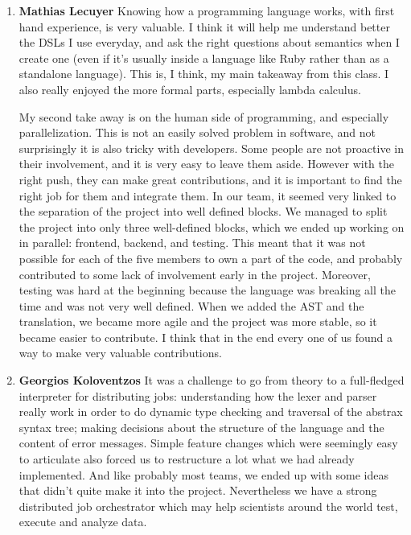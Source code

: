 \begin{enumerate}
\item \textbf{Mathias Lecuyer}
Knowing how a programming language works, with first hand experience, is very valuable.
I think it will help me understand better the DSLs I use everyday, and ask the right questions about semantics when I create one (even if it's usually inside a language like Ruby rather than as a standalone language).
This is, I think, my main takeaway from this class. I also really enjoyed the more formal parts, especially lambda calculus.

My second take away is on the human side of programming, and especially parallelization.
This is not an easily solved problem in software, and not surprisingly it is also tricky with developers.
Some people are not proactive in their involvement, and it is very easy to leave them aside.
However with the right push, they can make great contributions, and it is important to find the right job for them and integrate them.
In our team, it seemed very linked to the separation of the project into well defined blocks.
We managed to split the project into only three well-defined blocks, which we ended up working on in parallel: frontend, backend, and testing.
This meant that it was not possible for each of the five members to own a part of the code, and probably contributed to some lack of involvement early in the project.
Moreover, testing was hard at the beginning because the language was breaking all the time and was not very well defined.
When we added the AST and the translation, we became more agile and the project was more stable, so it became easier to contribute.
I think that in the end every one of us found a way to make very valuable contributions.


\item \textbf{Georgios Koloventzos}
It was a challenge to go from theory to a full-fledged interpreter for distributing jobs: understanding how the lexer and parser really work in order to do dynamic type checking and traversal of the abstrax syntax tree; making decisions about the structure of the language and the content of error messages. Simple feature changes which were seemingly easy to articulate also forced us to restructure a lot what we had already implemented. And like probably most teams, we ended up with some ideas that didn't quite make it into the project.
Nevertheless we have a strong distributed job orchestrator which may  help scientists around the world test, execute and analyze data.

\end{enumerate}
